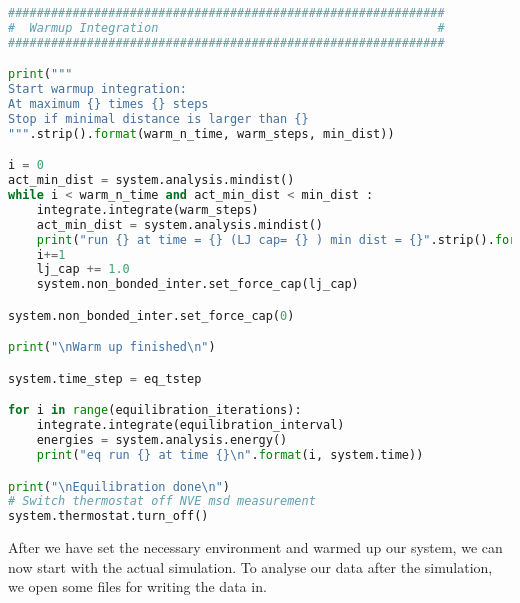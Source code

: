 \documentclass[
paper=a4,                       %
fontsize=11pt,                  %
twoside,                        %
footsepline,                    %
headsepline,                    %
headinclude=false,              %
footinclude=false,              %
pagesize,                       %
]{scrartcl}
\begin{document}
{\small\vspace{0,2cm}
\begin{lstlisting}[language=Python]
#############################################################
#  Warmup Integration                                       #
#############################################################

print("""
Start warmup integration:
At maximum {} times {} steps
Stop if minimal distance is larger than {}
""".strip().format(warm_n_time, warm_steps, min_dist))

i = 0
act_min_dist = system.analysis.mindist()
while i < warm_n_time and act_min_dist < min_dist :
    integrate.integrate(warm_steps)
    act_min_dist = system.analysis.mindist()
    print("run {} at time = {} (LJ cap= {} ) min dist = {}".strip().format(i, system.time, lj_cap, act_min_dist))
    i+=1
    lj_cap += 1.0
    system.non_bonded_inter.set_force_cap(lj_cap)

system.non_bonded_inter.set_force_cap(0)

print("\nWarm up finished\n")

system.time_step = eq_tstep 

for i in range(equilibration_iterations):
    integrate.integrate(equilibration_interval)
    energies = system.analysis.energy()
    print("eq run {} at time {}\n".format(i, system.time))

print("\nEquilibration done\n")
# Switch thermostat off NVE msd measurement
system.thermostat.turn_off()

\end{lstlisting}}\vspace{0,2cm}

\noindent After we have set the necessary environment and warmed up our system, we can now start with the actual 
simulation. To analyse our data after the simulation, we open some files for writing the data in. 
\end{document}
